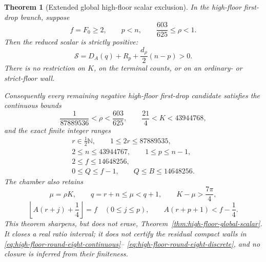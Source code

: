 \documentclass[11pt]{article}
\newtheorem{theorem}{Theorem}[section]
\theoremstyle{remark}
\newcommand{\N}{\mathbb N}
\begin{document}
\begin{theorem}[Extended global high-floor scalar exclusion]
\label{thm:high-floor-round-eight-scalar}
In the high-floor first-drop branch, suppose
\[
 f=F_0\geq2,\qquad p<n,\qquad
 \frac{603}{625}\leq\rho<1.
\]
Then the reduced scalar is strictly positive:
\begin{equation}
 \boxed{
 \mathcal S=D_A(q)+R_p+\frac{d_\rho}{2}(n-p)>0.}
 \label{eq:high-floor-round-eight-positive}
\end{equation}
There is no restriction on $K$, on the terminal counts, or on an
ordinary- or strict-floor wall.

Consequently every remaining negative high-floor first-drop candidate
satisfies the continuous bounds
\begin{equation}
 \boxed{
 \frac1{87889536}<\rho<\frac{603}{625},
 \qquad \frac{21}{4}<K<43944768,}
 \label{eq:high-floor-round-eight-continuous}
\end{equation}
and the exact finite integer ranges
\begin{equation}
 \boxed{
 \begin{gathered}
 r\in\tfrac12\N,\qquad 1\leq2r\leq87889535,\\
 2\leq n\leq43944767,\qquad 1\leq p\leq n-1,\\
 2\leq f\leq14648256,\\
 0\leq Q\leq f-1,\qquad Q\leq B\leq14648256.
 \end{gathered}}
 \label{eq:high-floor-round-eight-discrete}
\end{equation}
The chamber also retains
\begin{equation}
 \mu=\rho K,\qquad q=r+n\leq\mu<q+1,\qquad
 K-\mu>\frac{7\pi}{4},
 \label{eq:high-floor-round-eight-chamber-one}
\end{equation}
\begin{equation}
 \left\lfloor A(r+j)+\frac14\right\rfloor=f
 \quad(0\leq j\leq p),\qquad
 A(r+p+1)<f-\frac14.
 \label{eq:high-floor-round-eight-chamber-two}
\end{equation}
This theorem sharpens, but does not erase,
Theorem~\ref{thm:high-floor-global-scalar}.  It closes a real ratio
interval; it does not certify the residual compact walls in
\eqref{eq:high-floor-round-eight-continuous}--%
\eqref{eq:high-floor-round-eight-discrete}, and no closure is inferred
from their finiteness.
\end{theorem}
\end{document}
